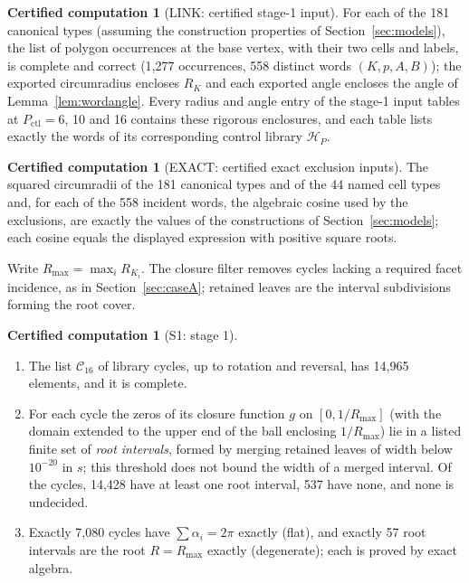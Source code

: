 \documentclass[11pt]{article}
\theoremstyle{definition}
\newtheorem{computation}[theorem]{Certified computation}
\theoremstyle{remark}
\begin{document}
\begin{appendices}
\begin{computation}[LINK: certified stage-1 input]\label{comp:link}
For each of the 181 canonical types (assuming the construction properties
of Section~\ref{sec:models}), the list of polygon occurrences at the base
vertex, with their two cells and labels, is complete and correct (1,277
occurrences, 558 distinct words $(K,p,A,B)$); the exported circumradius
encloses $R_K$ and each exported angle encloses the angle of
Lemma~\ref{lem:wordangle}. Every radius and angle entry of the
stage-1 input tables at $P_{\mathrm{ctl}}=6$, 10 and 16 contains these rigorous
enclosures, and each table lists exactly the words of its corresponding
control library $\mathcal H_P$.
\end{computation}

\begin{computation}[EXACT: certified exact exclusion inputs]\label{comp:exact}
The squared circumradii of the 181 canonical types and of the 44 named
cell types and, for each of the 558 incident words, the algebraic cosine
used by the exclusions, are exactly the values
of the constructions of Section~\ref{sec:models}; each cosine equals the
displayed expression with positive square roots.
\end{computation}

Write $R_{\max}=\max_iR_{K_i}$. The closure filter removes cycles lacking a required facet incidence, as in Section~\ref{sec:caseA}; retained leaves are the interval subdivisions forming the root cover.
\begin{computation}[S1: stage 1]\label{comp:S1}
\begin{enumerate}[label=\textup{(\roman*)}]
\item The list $\mathcal C_{16}$ of library cycles, up to rotation and
  reversal, has 14,965 elements, and it is complete.
\item For each cycle the zeros of its closure function $g$ on
  $[0,1/R_{\max}]$ (with the domain extended to the upper end of the ball
  enclosing $1/R_{\max}$) lie in a listed finite set of \emph{root
  intervals}, formed by merging retained leaves of width below
  $10^{-20}$ in $s$; this threshold does not bound the width of a merged
  interval. Of the cycles, 14,428 have at
  least one root interval, 537 have none, and none is undecided.
\item Exactly 7,080 cycles have $\sum\alpha_i=2\pi$ exactly (flat), and
  exactly 57 root intervals are the root $R=R_{\max}$ exactly
  (degenerate); each is proved by exact algebra.
\end{enumerate}
\end{computation}


\end{appendices}
\end{document}
